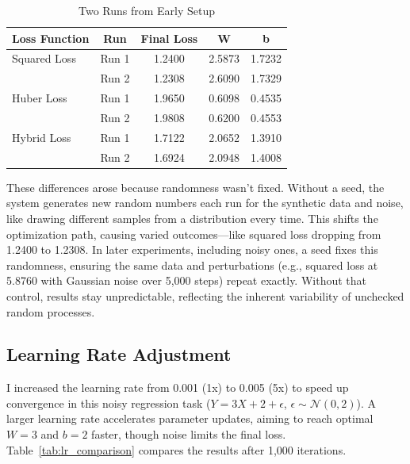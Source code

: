 \documentclass{article}
\begin{document}
\begin{table}[H]
    \centering
    \caption{Two Runs from Early Setup}
    \label{tab:run_comparison}
    \begin{tabular}{lcccc}
        \toprule
        \textbf{Loss Function} & \textbf{Run} & \textbf{Final Loss} & \textbf{W} & \textbf{b} \\
        \midrule
        Squared Loss & Run 1 & 1.2400 & 2.5873 & 1.7232 \\
                     & Run 2 & 1.2308 & 2.6090 & 1.7329 \\
        Huber Loss   & Run 1 & 1.9650 & 0.6098 & 0.4535 \\
                     & Run 2 & 1.9808 & 0.6200 & 0.4553 \\
        Hybrid Loss  & Run 1 & 1.7122 & 2.0652 & 1.3910 \\
                     & Run 2 & 1.6924 & 2.0948 & 1.4008 \\
        \bottomrule
    \end{tabular}
\end{table}

These differences arose because randomness wasn’t fixed. Without a seed, the system generates new random numbers each run for the synthetic data and noise, like drawing different samples from a distribution every time. This shifts the optimization path, causing varied outcomes—like squared loss dropping from 1.2400 to 1.2308. In later experiments, including noisy ones, a seed fixes this randomness, ensuring the same data and perturbations (e.g., squared loss at 5.8760 with Gaussian noise over 5,000 steps) repeat exactly. Without that control, results stay unpredictable, reflecting the inherent variability of unchecked random processes.

\subsection{Learning Rate Adjustment}

I increased the learning rate from 0.001 (1x) to 0.005 (5x) to speed up convergence in this noisy regression task (\( Y = 3X + 2 + \epsilon \), \( \epsilon \sim \mathcal{N}(0, 2) \)). A larger learning rate accelerates parameter updates, aiming to reach optimal \( W = 3 \) and \( b = 2 \) faster, though noise limits the final loss. Table~\ref{tab:lr_comparison} compares the results after 1,000 iterations.
\end{document}
